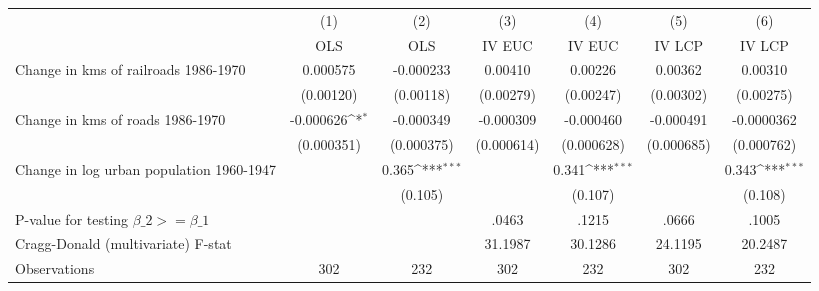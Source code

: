 {
\def\sym#1{\ifmmode^{#1}\else\(^{#1}\)\fi}
\begin{tabular}{l*{6}{c}}
\hline\hline
                &\multicolumn{1}{c}{(1)}&\multicolumn{1}{c}{(2)}&\multicolumn{1}{c}{(3)}&\multicolumn{1}{c}{(4)}&\multicolumn{1}{c}{(5)}&\multicolumn{1}{c}{(6)}\\
                &\multicolumn{1}{c}{OLS}&\multicolumn{1}{c}{OLS}&\multicolumn{1}{c}{IV EUC}&\multicolumn{1}{c}{IV EUC}&\multicolumn{1}{c}{IV LCP}&\multicolumn{1}{c}{IV LCP}\\
\hline
Change in kms of railroads 1986-1970& 0.000575         &-0.000233         &  0.00410         &  0.00226         &  0.00362         &  0.00310         \\
                &(0.00120)         &(0.00118)         &(0.00279)         &(0.00247)         &(0.00302)         &(0.00275)         \\
[1em]
Change in kms of roads 1986-1970&-0.000626\sym{*}  &-0.000349         &-0.000309         &-0.000460         &-0.000491         &-0.0000362         \\
                &(0.000351)         &(0.000375)         &(0.000614)         &(0.000628)         &(0.000685)         &(0.000762)         \\
[1em]
Change in log urban population 1960-1947&                  &    0.365\sym{***}&                  &    0.341\sym{***}&                  &    0.343\sym{***}\\
                &                  &  (0.105)         &                  &  (0.107)         &                  &  (0.108)         \\
\hline
P-value for testing $\beta\_{2} >= \beta\_{1}$&                  &                  &    .0463         &    .1215         &    .0666         &    .1005         \\
Cragg-Donald (multivariate) F-stat&                  &                  &  31.1987         &  30.1286         &  24.1195         &  20.2487         \\
Observations    &      302         &      232         &      302         &      232         &      302         &      232         \\
\hline\hline
\end{tabular}
}
